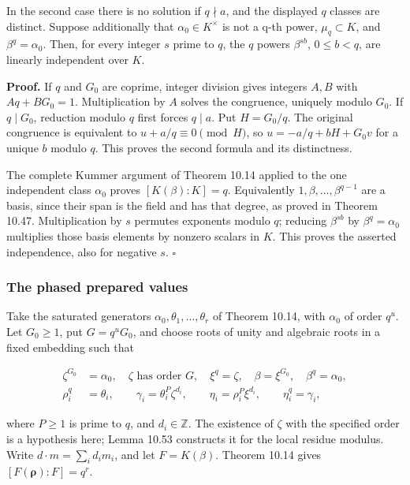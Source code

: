 \documentclass[
  11pt,
  a4paper,
]{article}
\begin{document}
In the second case there is no solution if \(q\nmid a\), and the
displayed \(q\) classes are distinct. Suppose additionally that
\(\alpha_0\in K^\times\) is not a q-th power, \(\mu_q\subset K\), and
\(\beta^q=\alpha_0\). Then, for every integer \(s\) prime to \(q\), the
\(q\) powers \(\beta^{sb}\), \(0\le b<q\), are linearly independent over
\(K\).

\textbf{Proof.} If \(q\) and \(G_0\) are coprime, integer division gives
integers \(A,B\) with \(Aq+BG_0=1\). Multiplication by \(A\) solves the
congruence, uniquely modulo \(G_0\). If \(q\mid G_0\), reduction modulo
\(q\) first forces \(q\mid a\). Put \(H=G_0/q\). The original congruence
is equivalent to \(u+a/q\equiv0\pmod H\), so \(u=-a/q+bH+G_0v\) for a
unique \(b\) modulo \(q\). This proves the second formula and its
distinctness.

The complete Kummer argument of Theorem 10.14 applied to the one
independent class \(\alpha_0\) proves \([K(\beta):K]=q\). Equivalently
\(1,\beta,\ldots,\beta^{q-1}\) are a basis, since their span is the
field and has that degree, as proved in Theorem 10.47. Multiplication by
\(s\) permutes exponents modulo \(q\); reducing \(\beta^{sb}\) by
\(\beta^q=\alpha_0\) multiplies those basis elements by nonzero scalars
in \(K\). This proves the asserted independence, also for negative
\(s\). \(\square\)

\subsubsection{The phased prepared
values}\label{the-phased-prepared-values}

Take the saturated generators \(\alpha_0,\theta_1,\ldots,\theta_r\) of
Theorem 10.14, with \(\alpha_0\) of order \(q^u\). Let \(G_0\ge1\), put
\(G=q^uG_0\), and choose roots of unity and algebraic roots in a fixed
embedding such that

\[
\begin{aligned}
\zeta^{G_0}&=\alpha_0,\quad \zeta\text{ has order }G,\quad
\xi^q=\zeta,\quad \beta=\xi^{G_0},\quad \beta^q=\alpha_0,\\
\rho_i^q&=\theta_i,\qquad
\gamma_i=\theta_i^P\zeta^{d_i},\qquad
\eta_i=\rho_i^P\xi^{d_i},\qquad \eta_i^q=\gamma_i ,
\end{aligned}
\tag{10.138}
\]

where \(P\ge1\) is prime to \(q\), and \(d_i\in\mathbb Z\). The
existence of \(\zeta\) with the specified order is a hypothesis here;
Lemma 10.53 constructs it for the local residue modulus. Write
\(d\cdot m=\sum_i d_i m_i\), and let \(F=K(\beta)\). Theorem 10.14 gives
\([F(\boldsymbol\rho):F]=q^r\).
\end{document}
